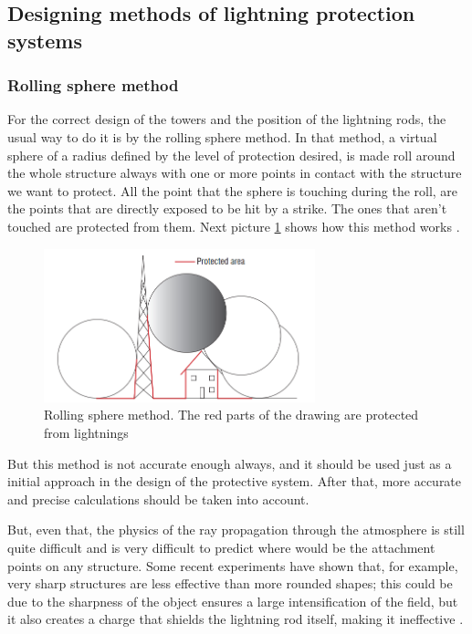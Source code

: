 \subsection{Designing methods of lightning protection systems}
\subsubsection{Rolling sphere method}

For the correct design of the towers and the position of the lightning rods, the
usual way to do it is by the rolling sphere method. In that method, a virtual
sphere of a radius defined by the level of protection desired, is made roll around
the whole structure always with one or more points in contact with the
structure we want to protect. All the point that the sphere is touching during the
roll, are the points that are directly exposed to be hit by a strike. The ones that
aren't touched are protected from them. Next picture \ref{fig:rsm} shows how this
method works \cite{2012Issac}.

\begin{figure}[h!]
	\centering
	\includegraphics[width=0.7\textwidth]{img/Rolling_sphere_method.png}
	\caption[Rolling sphere method explanation]
	{Rolling sphere method. The red parts of the drawing are protected from lightnings}
	\label{fig:rsm}
\end{figure}

But this method is not accurate enough always, and it should be used just as a
initial approach in the design of the protective system. After that, more accurate
and precise calculations should be taken into account.

But, even that, the physics of the ray propagation through the atmosphere is still
quite difficult and is very difficult to predict where would be the attachment
points on any structure. Some recent experiments have shown that, for example,
very sharp structures are less effective than more rounded shapes;
this could be due to the sharpness of the object ensures a large intensification of the
field, but it also creates a charge that shields the lightning rod itself, making it
ineffective \cite{2004RISON}.

